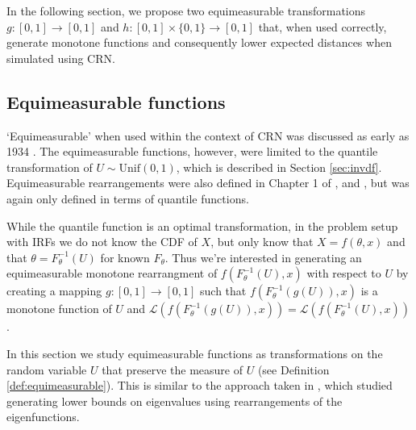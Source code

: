 \documentclass[12pt]{article}
\theoremstyle{plain}%
\theoremstyle{definition}
\newtheorem{definition}{Definition}[section]
\def\unif{\mathrm{Unif}}
\begin{document}
In the following section, we propose two equimeasurable transformations $g:[0,1]\to [0,1]$ and $h:[0,1]\times \{0,1\}\to [0,1]$ that, when used correctly, generate monotone functions and consequently lower expected distances when simulated using CRN. 

\subsection{Equimeasurable functions}
`Equimeasurable' when used within the context of CRN was discussed as early as 1934 \cite{inequalities}. The equimeasurable functions, however, were limited to the quantile transformation of $U\sim \unif(0,1)$, which is described in Section \ref{sec:invdf}. %
Equimeasurable rearrangements were also defined in Chapter 1 of \cite{villani}, and \cite{quantile1}, but was again only defined in terms of quantile functions. 

While the quantile function is an optimal transformation, in the problem setup with IRFs we do not know the CDF of $X$, but only know that $X=f(\theta,x)$ and that $\theta=F^{-1}_{\theta}(U)$ for known $F_{\theta}$. Thus we're interested in generating an equimeasurable monotone rearrangment of $f(F^{-1}_{\theta}(U),x)$ with respect to $U$ by creating a mapping $g:[0,1]\to [0,1]$ such that $f(F^{-1}_{\theta}(g(U)),x)$ is a monotone function of $U$ and $\mathcal{L}(f(F^{-1}_{\theta}(g(U)),x))=\mathcal{L}(f(F^{-1}_{\theta}(U),x))$. %

In this section we study equimeasurable functions as transformations on the random variable $U$ that preserve the measure of $U$ (see Definition \ref{def:equimeasurable}). This is similar to the approach taken in \cite{equimeasurable, equimeasurable2}, which studied generating lower bounds on eigenvalues using rearrangements of the eigenfunctions. 
\end{document}
